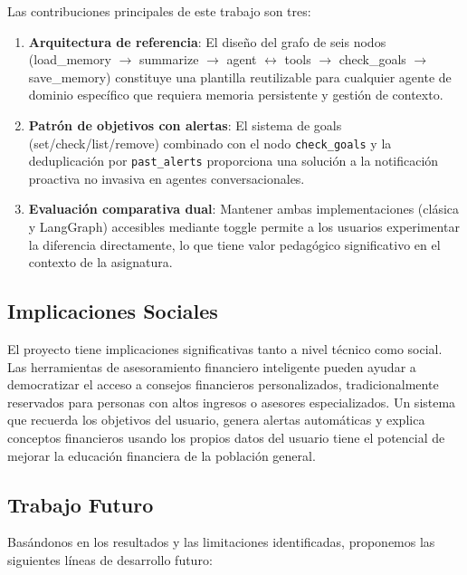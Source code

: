 Las contribuciones principales de este trabajo son tres:

\begin{enumerate}
    \item \textbf{Arquitectura de referencia}: El diseño del grafo de seis nodos (load\_memory $\rightarrow$ summarize $\rightarrow$ agent $\leftrightarrow$ tools $\rightarrow$ check\_goals $\rightarrow$ save\_memory) constituye una plantilla reutilizable para cualquier agente de dominio específico que requiera memoria persistente y gestión de contexto.

    \item \textbf{Patrón de objetivos con alertas}: El sistema de goals (set/check/list/remove) combinado con el nodo \texttt{check\_goals} y la deduplicación por \texttt{past\_alerts} proporciona una solución a la notificación proactiva no invasiva en agentes conversacionales.

    \item \textbf{Evaluación comparativa dual}: Mantener ambas implementaciones (clásica y LangGraph) accesibles mediante toggle permite a los usuarios experimentar la diferencia directamente, lo que tiene valor pedagógico significativo en el contexto de la asignatura.
\end{enumerate}

\subsection{Implicaciones Sociales}
\label{subsec:implicaciones}

El proyecto tiene implicaciones significativas tanto a nivel técnico como social. Las herramientas de asesoramiento financiero inteligente pueden ayudar a democratizar el acceso a consejos financieros personalizados, tradicionalmente reservados para personas con altos ingresos o asesores especializados. Un sistema que recuerda los objetivos del usuario, genera alertas automáticas y explica conceptos financieros usando los propios datos del usuario tiene el potencial de mejorar la educación financiera de la población general.

\subsection{Trabajo Futuro}
\label{subsec:trabajo_futuro}

Basándonos en los resultados y las limitaciones identificadas, proponemos las siguientes líneas de desarrollo futuro:

